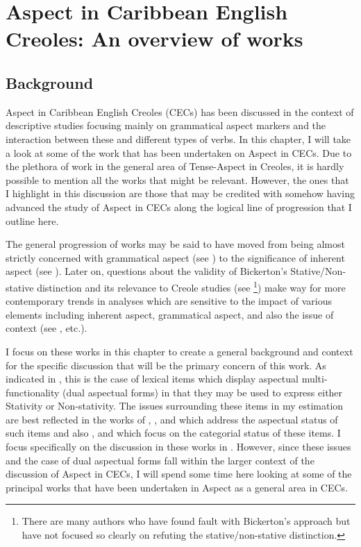 \chapter{Aspect in Caribbean English Creoles: An overview of
  works}\label{sec:2}\label{ch:2}
\section{Background}\label{sec:2.0}

Aspect in Caribbean English Creoles (CECs) has been discussed in the
context of descriptive studies focusing mainly on grammatical aspect
markers and the interaction between these and different types of
verbs.  In this chapter, I will take a look at some of the work that
has been undertaken on Aspect in CECs.  Due to the plethora of work in
the general area of Tense-Aspect in Creoles, it is hardly possible to
mention all the works that might be relevant.  However, the ones that
I highlight in this discussion are those that may be credited with
somehow having advanced the study of Aspect in CECs along the logical
line of progression that I outline here.

The general progression of works may be said to have moved from being
almost strictly concerned with grammatical aspect (see
\citealt{Alleyne1980,Voorhoeve1957}) to the significance of inherent
aspect (see \citealt{Bickerton1975,Bickerton1981}).  Later on, questions about
the validity of Bickerton’s Stative\slash Non-stative distinction and its
relevance to Creole studies (see
\citealt{Jaganauth1987}\footnote{There are many authors who have found
  fault with Bickerton’s approach but have not focused so clearly on
  refuting the stative\slash non-stative distinction.}) make way for more
contemporary trends in analyses which are sensitive to the impact of
various elements including inherent aspect, grammatical aspect, and
also the issue of context (see \citealt{Gooden2008,Sidnell2002,Winford1993,
Winford1997,Winford2000}, etc.).

I focus on these works in this chapter to create a general background
and context for the specific discussion that will be the primary
concern of this work.  As indicated in , this is the case
of lexical items which display aspectual multi-functionality (dual
aspectual forms) in that they may be used to express either Stativity
or Non-stativity.  The issues surrounding these items in my estimation
are best reflected in the works of \citet{Alleyne1980},
\citet{Jaganauth1987}, and \citet{Winford1993} which address the
aspectual status of such items and also \citet{Sebba1986},
\citet{Seuren1986} and \citet{Kouwenberg1996} which focus on the
categorial status of these items.  I focus specifically on the
discussion in these works in .  However, since these
issues and the case of dual aspectual forms fall within the larger
context of the discussion of Aspect in CECs, I will spend some time
here looking at some of the principal works that have been undertaken
in Aspect as a general area in CECs.

